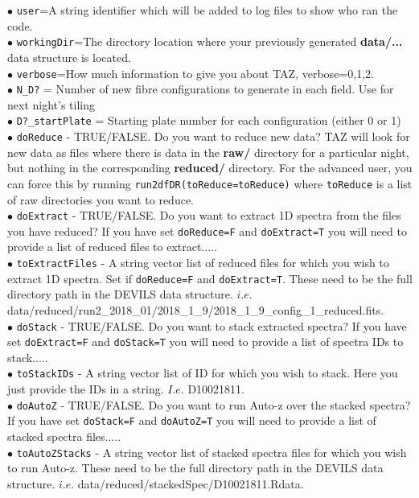\documentclass[12pt]{article}
\begin{document}
$\bullet$ \texttt{user}=A string identifier which will be added to log files to show who ran the code. \\
$\bullet$ \texttt{workingDir}=The directory location where your previously generated \textbf{data/...} data structure is located.\\
$\bullet$ \texttt{verbose}=How much information to give you about TAZ,  verbose=0,1,2.\\
$\bullet$ \texttt{N\_D?} = Number of new fibre configurations to generate in each field. Use for next night's tiling\\
$\bullet$ \texttt{D?\_startPlate} = Starting plate number for each configuration (either 0 or 1)\\
$\bullet$ \texttt{doReduce} - TRUE/FALSE. Do you want to reduce new data? TAZ will look for new data as files where there is data in the \textbf{raw/} directory for a particular night, but nothing in the corresponding \textbf{reduced/} directory. For the advanced user, you can force this by running \texttt{run2dfDR(toReduce=toReduce)} where \texttt{toReduce} is a list of raw directories you want to reduce. \\
$\bullet$ \texttt{doExtract} - TRUE/FALSE. Do you want to extract 1D spectra from the files you have reduced? If you have set \texttt{doReduce=F} and \texttt{doExtract=T} you will need to provide a list of reduced files to extract..... \\
$\bullet$ \texttt{toExtractFiles} - A string vector list of reduced files for which you wish to extract 1D spectra. Set if \texttt{doReduce=F} and \texttt{doExtract=T}. These need to be the full directory path in the DEVILS data structure. $i.e.$ data/reduced/run2\_2018\_01/2018\_1\_9/2018\_1\_9\_config\_1\_reduced.fits. \\
$\bullet$ \texttt{doStack} - TRUE/FALSE. Do you want to stack extracted spectra? If you have set \texttt{doExtract=F} and \texttt{doStack=T} you will need to provide a list of spectra IDs to stack..... \\
$\bullet$ \texttt{toStackIDs} - A string vector list of ID for which you wish to stack. Here you just provide the IDs in a string. $I.e.$ D10021811.\\
$\bullet$ \texttt{doAutoZ} - TRUE/FALSE. Do you want to run Auto-z over the stacked spectra? If you have set \texttt{doStack=F} and \texttt{doAutoZ=T} you will need to provide a list of stacked spectra files..... \\
$\bullet$ \texttt{toAutoZStacks} - A string vector list of stacked spectra files for which you wish to run Auto-z. These need to be the full directory path in the DEVILS data structure. $i.e.$ data/reduced/stackedSpec/D10021811.Rdata. \\
\end{document}
